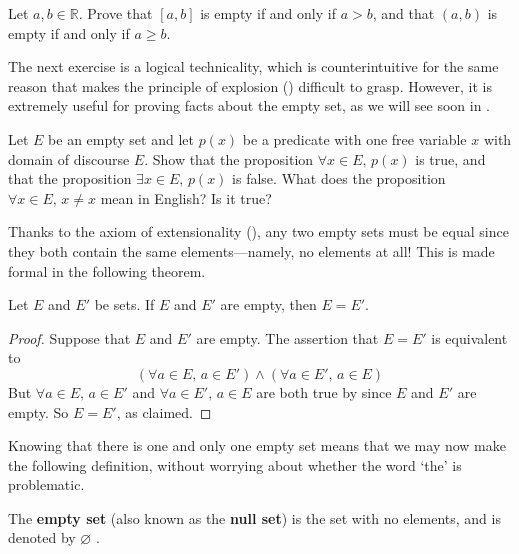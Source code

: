 \begin{exercise}
Let $a,b \in \mathbb{R}$. Prove that $[a,b]$ is empty if and only if $a > b$, and that $(a,b)$ is empty if and only if $a \ge b$.
\end{exercise}

The next exercise is a logical technicality, which is counterintuitive for the same reason that makes the principle of explosion () difficult to grasp. However, it is extremely useful for proving facts about the empty set, as we will see soon in .

\begin{exercise}
Let $E$ be an empty set and let $p(x)$ be a predicate with one free variable $x$ with domain of discourse $E$. Show that the proposition $\forall x \in E,\, p(x)$ is true, and that the proposition $\exists x \in E,\, p(x)$ is false. What does the proposition $\forall x \in E,\, x \ne x$ mean in English? Is it true?
\end{exercise}

Thanks to the axiom of extensionality (), any two empty sets must be equal since they both contain the same elements---namely, no elements at all! This is made formal in the following theorem.

\begin{theorem}
\label{thmEmptySetIsUnique}
Let $E$ and $E'$ be sets. If $E$ and $E'$ are empty, then $E=E'$.
\end{theorem}
\begin{proof}
Suppose that $E$ and $E'$ are empty. The assertion that $E=E'$ is equivalent to
\[ (\forall a \in E,\, a \in E') \wedge (\forall a \in E',\, a \in E) \]
But $\forall a \in E,\, a \in E'$ and $\forall a \in E',\, a \in E$ are both true by  since $E$ and $E'$ are empty. So $E=E'$, as claimed.
\end{proof}

Knowing that there is one and only one empty set means that we may now make the following definition, without worrying about whether the word `the' is problematic.

\begin{definition}
\label{defEmptySet}
The \textbf{empty set} (also known as the \textbf{null set}) is the set with no elements, and is denoted by $\varnothing$ .
\end{definition}

